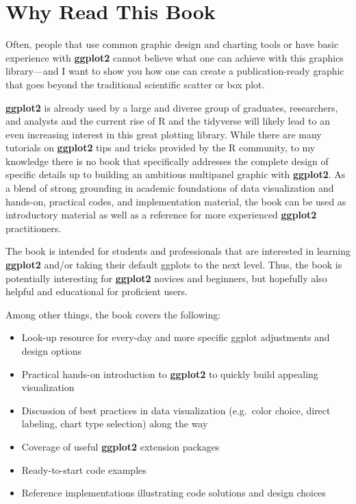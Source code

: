 \documentclass[
]{krantz}
\providecommand{\tightlist}{%
  \setlength{\itemsep}{0pt}\setlength{\parskip}{0pt}}
\begin{document}
\hypertarget{why-read-this-book}{%
\section*{Why Read This Book}\label{why-read-this-book}}


Often, people that use common graphic design and charting tools or have basic experience with \textbf{ggplot2} cannot believe what one can achieve with this graphics library---and I want to show you how one can create a publication-ready graphic that goes beyond the traditional scientific scatter or box plot.

\textbf{ggplot2} is already used by a large and diverse group of graduates, researchers, and analysts and the current rise of R and the tidyverse will likely lead to an even increasing interest in this great plotting library. While there are many tutorials on \textbf{ggplot2} tips and tricks provided by the R community, to my knowledge there is no book that specifically addresses the complete design of specific details up to building an ambitious multipanel graphic with \textbf{ggplot2}. As a blend of strong grounding in academic foundations of data visualization and hands-on, practical codes, and implementation material, the book can be used as introductory material as well as a reference for more experienced \textbf{ggplot2} practitioners.

The book is intended for students and professionals that are interested in learning \textbf{ggplot2} and/or taking their default ggplots to the next level. Thus, the book is potentially interesting for \textbf{ggplot2} novices and beginners, but hopefully also helpful and educational for proficient users.

Among other things, the book covers the following:

\begin{itemize}
\tightlist
\item
  Look-up resource for every-day and more specific ggplot adjustments and design options
\item
  Practical hands-on introduction to \textbf{ggplot2} to quickly build appealing visualization
\item
  Discussion of best practices in data visualization (e.g.~color choice, direct labeling, chart type selection) along the way
\item
  Coverage of useful \textbf{ggplot2} extension packages
\item
  Ready-to-start code examples
\item
  Reference implementations illustrating code solutions and design choices
\end{itemize}
\end{document}
